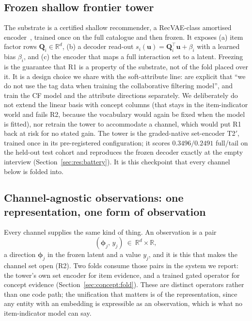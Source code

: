 \documentclass[acmsmall,review,anonymous]{acmart}
\newcommand{\R}{\mathbb{R}}
\newcommand{\Q}{\mathbf{Q}}
\newcommand{\uu}{\mathbf{u}}
\newcommand{\bphi}{\boldsymbol{\phi}}
\begin{document}
\subsection{Frozen shallow frontier tower}
The substrate is a certified shallow recommender, a RecVAE-class amortised encoder~\citep{ren2020recvae}, trained once on the full catalogue and then frozen. It exposes (a) item factor rows $\Q_i\in\R^{d}$, (b) a decoder read-out $s_i(\uu)=\Q_i^\top\uu + \beta_i$ with a learned bias $\beta_i$, and (c) the encoder that maps a full interaction set to a latent. Freezing is the guarantee that R1 is a property of the substrate, not of the fold placed over it. It is a design choice we share with the soft-attribute line: \citet{gopfert2024cav} are explicit that ``we do not use the tag data when training the collaborative filtering model'', and \citet{biyik2023soft} train the CF model and the attribute directions separately. We deliberately do not extend the linear basis with concept columns (that stays in the item-indicator world and fails R2, because the vocabulary would again be fixed when the model is fitted), nor retrain the tower to accommodate a channel, which would put R1 back at risk for no stated gain. The tower is the graded-native set-encoder T2$'$, trained once in its pre-registered configuration; it scores $0.3496/0.2491$ full/tail on the held-out test cohort and reproduces the frozen decoder exactly at the empty interview (Section~\ref{sec:res:battery}). It is this checkpoint that every channel below is folded into.

\subsection{Channel-agnostic observations: one representation, one form of observation}
Every channel supplies the same kind of thing. An observation is a pair
\begin{equation}\label{eq:obs}
  (\bphi_j,\,y_j)\ \in\ \R^{d}\times\R,
\end{equation}
a direction $\bphi_j$ in the frozen latent and a value $y_j$, and it is this that makes the channel set open (R2). Two folds consume those pairs in the system we report: the tower's own set encoder for item evidence, and a trained gated operator for concept evidence (Section~\ref{sec:concept:fold}). These are distinct operators rather than one code path; the unification that matters is of the representation, since any entity with an embedding is expressible as an observation, which is what no item-indicator model can say.
\end{document}
